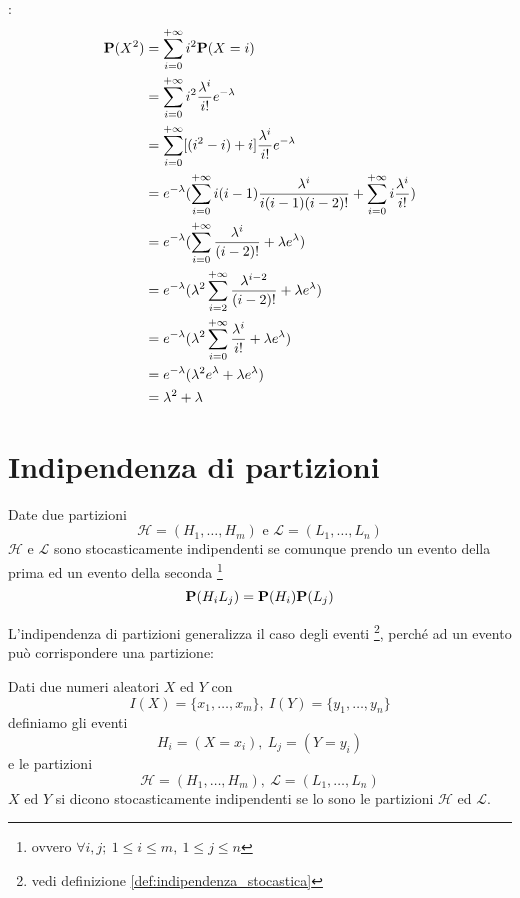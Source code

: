 :
\begin{align*}
  \mathbf{P}(X^2) &= \sum_{i=0}^{+ \infty} i^2 \mathbf{P}(X = i) \\
  &= \sum_{i=0}^{+ \infty} i^2 \frac{\lambda^i}{i!} e^{- \lambda} \\
  &= \sum_{i=0}^{+ \infty} [(i^2 - i) + i] \frac{\lambda^i}{i!} e^{- \lambda} \\
  &= e^{- \lambda} (\sum_{i=0}^{+ \infty} i(i - 1) \frac{\lambda^i}{i(i-1)(i-2)!} + \sum_{i=0}^{+ \infty} i \frac{\lambda^i}{i!}) \\
  &= e^{- \lambda} (\sum_{i=0}^{+ \infty} \frac{\lambda^i}{(i-2)!} + \lambda e^\lambda) \\
  &= e^{- \lambda} (\lambda^2 \sum_{i=2}^{+ \infty} \frac{\lambda^{i-2}}{(i-2)!} + \lambda e^\lambda) \\
  &= e^{- \lambda} (\lambda^2 \sum_{i=0}^{+ \infty} \frac{\lambda^i}{i!} + \lambda e^\lambda) \\
  &= e^{- \lambda} (\lambda^2 e^\lambda + \lambda e^\lambda) \\
  &= \lambda^2 + \lambda
\end{align*}

\section{Indipendenza di partizioni} %
\begin{definition}
  \label{def:indipendenza_di_partizioni}
  Date due partizioni
  \[ \mathcal{H} = (H_1, \ldots, H_m) \text{ e } \mathcal{L} = (L_1, \ldots, L_n) \]
  \( \mathcal{H} \) e \( \mathcal{L} \) sono stocasticamente indipendenti se comunque prendo un evento della prima ed un evento della seconda
  \footnote{ovvero \( \forall i, j; ~ 1 \le i \le m, ~ 1 \le j \le n \)}
  \[ \mathbf{P}(H_i L_j) = \mathbf{P}(H_i) \mathbf{P}(L_j) \]
\end{definition}

L'indipendenza di partizioni generalizza il caso degli eventi
\footnote{vedi definizione \ref{def:indipendenza_stocastica}},
perché ad un evento può corrispondere una partizione:
\begin{definition}
  Dati due numeri aleatori \( X \) ed \( Y \) con
  \[ I(X) = \{ x_1, \ldots, x_m \}, ~ I(Y) = \{ y_1, \ldots, y_n \} \]
  definiamo gli eventi
  \[ H_i = (X = x_i), ~ L_j = (Y = y_i) \]
  e le partizioni
  \[ \mathcal{H} = (H_1, \ldots, H_m), ~ \mathcal{L} = (L_1, \ldots, L_n) \]
  \( X \) ed \( Y \) si dicono stocasticamente indipendenti se lo sono le partizioni \( \mathcal{H} \) ed \( \mathcal{L} \).
\end{definition}
